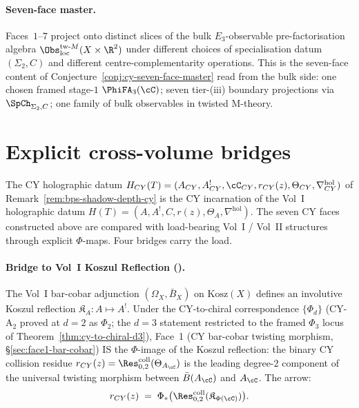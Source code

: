 \paragraph{Seven-face master.} Faces~$1$--$7$ project onto distinct
slices of the bulk $E_3$-observable pre-factorisation algebra
$\Obs^{\mathrm{tw}\text{-}M}_{\mathrm{loc}}(X \times \R^2)$ under
different choices of specialisation datum $(\Sigma_2, C)$ and different
centre-complementarity operations. This is the seven-face content of
Conjecture~\ref{conj:cy-seven-face-master} read from the bulk side:
one chosen framed stage-$1$ $\PhiFA_3(\cC)$; seven tier-\textup{(iii)}
boundary projections via $\SpCh_{\Sigma_2, C}$; one family of bulk
observables in twisted M-theory.


\section{Explicit cross-volume bridges}
\label{sec:cy-cross-volume-bridges}

The CY holographic datum
$H_{CY}(T) = (A_{CY}, A_{CY}^!, \cC_{CY}, r_{CY}(z), \Theta_{CY}, \nabla^{\mathrm{hol}}_{CY})$
of Remark~\ref{rem:bps-shadow-depth-cy} is the CY incarnation of the
Vol~I holographic datum
$H(T) = (A, A^!, C, r(z), \Theta_A, \nabla^{\mathrm{hol}})$. The seven
CY faces constructed above are compared with load-bearing Vol~I /
Vol~II structures through explicit \(\Phi\)-maps. Four bridges carry the
load.

\paragraph{Bridge to Vol~I Koszul Reflection (\cite{VolI}).}
The Vol~I bar-cobar adjunction $(\Omega_X, \bar B_X)$ on $\mathrm{Kosz}(X)$
defines an involutive Koszul reflection $\mathfrak{K}_A \colon A \mapsto A^!$.
Under the CY-to-chiral correspondence $\{\Phi_d\}$ (CY-A$_2$ proved at $d = 2$ as $\Phi_2$;
the $d = 3$ statement restricted to the framed $\Phi_3$ locus of
Theorem~\ref{thm:cy-to-chiral-d3}), Face~1
(CY bar-cobar twisting morphism, \S\ref{sec:face1-bar-cobar}) IS the
$\Phi$-image of the Koszul reflection: the binary CY collision residue
$r_{CY}(z) = \Res^{\mathrm{coll}}_{0,2}(\Theta_{A_\cC})$ is the leading
degree-$2$ component of the universal twisting morphism between
$\bar B(A_\cC)$ and $A_\cC$. The arrow:
\[
 r_{CY}(z) \;=\; \Phi_*\bigl(\Res^{\mathrm{coll}}_{0,2}(\mathfrak{K}_{\Phi(\cC)})\bigr).
\]

